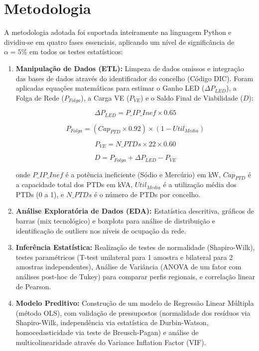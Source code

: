 \documentclass[conference]{IEEEtran}
\begin{document}
\section{Metodologia}

A metodologia adotada foi suportada inteiramente na linguagem Python e dividiu-se em quatro fases essenciais, aplicando um nível de significância de $\alpha = 5\%$ em todos os testes estatísticos:

\begin{enumerate}
    \item \textbf{Manipulação de Dados (ETL):} Limpeza de dados omissos e integração das bases de dados através do identificador do concelho (Código DIC). Foram aplicadas equações matemáticas para estimar o Ganho LED ($\Delta P_{LED}$), a Folga de Rede ($P_{Folga}$), a Carga VE ($P_{VE}$) e o Saldo Final de Viabilidade ($D$):
    
    \begin{equation}
        \Delta P_{LED} = P\_IP\_Inef \times 0.65
    \end{equation}
    
    \begin{equation}
        P_{Folga} = (Cap_{PTD} \times 0.92) \times (1 - Util_{Media})
    \end{equation}
    
    \begin{equation}
        P_{VE} = N\_PTDs \times 22 \times 0.60
    \end{equation}
    
    \begin{equation}
        D = P_{Folga} + \Delta P_{LED} - P_{VE}
    \end{equation}

    onde $P\_IP\_Inef$ é a potência ineficiente (Sódio e Mercúrio) em kW, $Cap_{PTD}$ é a capacidade total dos PTDs em kVA, $Util_{Media}$ é a utilização média dos PTDs (0 a 1), e $N\_PTDs$ é o número de PTDs por concelho.

    \item \textbf{Análise Exploratória de Dados (EDA):} Estatística descritiva, gráficos de barras (mix tecnológico) e boxplots para análise de distribuição e identificação de outliers nos níveis de ocupação da rede.

    \item \textbf{Inferência Estatística:} Realização de testes de normalidade (Shapiro-Wilk), testes paramétricos (T-test unilateral para 1 amostra e bilateral para 2 amostras independentes), Análise de Variância (ANOVA de um fator com análises post-hoc de Tukey) para comparar perfis regionais, e correlação linear de Pearson.

    \item \textbf{Modelo Preditivo:} Construção de um modelo de Regressão Linear Múltipla (método OLS), com validação de pressupostos (normalidade dos resíduos via Shapiro-Wilk, independência via estatística de Durbin-Watson, homocedasticidade via teste de Breusch-Pagan) e análise de multicolinearidade através do Variance Inflation Factor (VIF).
\end{enumerate}
\end{document}
